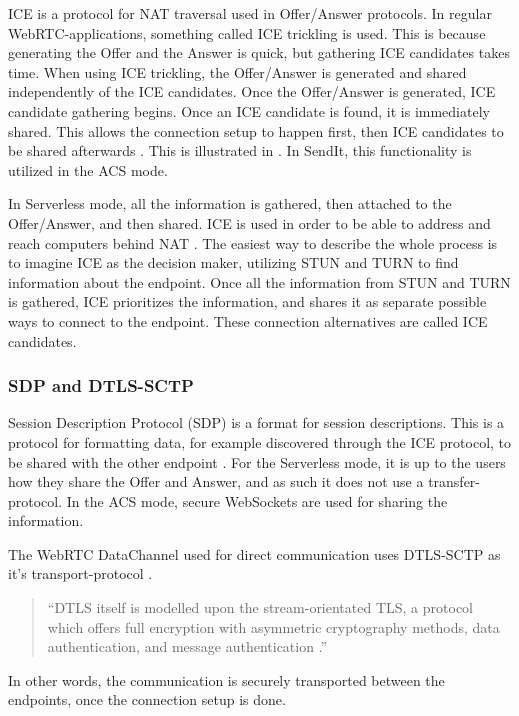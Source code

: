     ICE is a protocol for NAT traversal used in Offer/Answer protocols. In regular WebRTC-applications, something called ICE trickling is used. This is because generating the Offer and the Answer is quick, but gathering ICE candidates takes time. When using ICE trickling, the Offer/Answer is generated and shared independently of the ICE candidates. Once the Offer/Answer is generated, ICE candidate gathering begins. Once an ICE candidate is found, it is immediately shared. This allows the connection setup to happen first, then ICE candidates to be shared afterwards \cite{ar_ice_trickle}.  This is illustrated in . In SendIt, this functionality is utilized in the ACS mode.

    In Serverless mode, all the information is gathered, then attached to the Offer/Answer, and then shared. ICE is used in order to be able to address and reach computers behind NAT \cite{ar_ice}. The easiest way to describe the whole process is to imagine ICE as the decision maker, utilizing STUN and TURN to find information about the endpoint. Once all the information from STUN and TURN is gathered, ICE prioritizes the information, and shares it as separate possible ways to connect to the endpoint. These connection alternatives are called ICE candidates.
    \subsubsection*{SDP and DTLS-SCTP}
    Session Description Protocol (SDP) is a format for session descriptions. This is a protocol for formatting data, for example discovered through the ICE protocol, to be shared with the other endpoint \cite{ar_sdp}. For the Serverless mode, it is up to the users how they share the Offer and Answer, and as such it does not use a transfer-protocol. In the ACS mode, secure WebSockets are used for sharing the information.

    The WebRTC DataChannel used for direct communication uses DTLS-SCTP as it's transport-protocol \cite{ar_webrtc_dc}.
    \begin{quotation}
        \enquote{DTLS itself is modelled upon the stream-orientated TLS, a protocol which offers full encryption with asymmetric cryptography methods, data authentication, and message authentication \cite{StudyWebRTCSecurity}.}
    \end{quotation}
    In other words, the communication is securely transported between the endpoints, once the connection setup is done.

